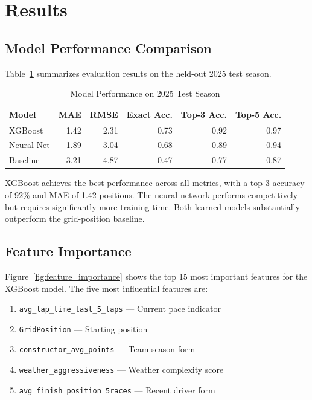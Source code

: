 \section{Results}
\label{sec:results}

\subsection{Model Performance Comparison}

Table~\ref{tab:model_comparison} summarizes evaluation results on the held-out
2025 test season.

\begin{table}[h]
\centering
\caption{Model Performance on 2025 Test Season}
\label{tab:model_comparison}
\begin{tabular}{lrrrrr}
\toprule
\textbf{Model} & \textbf{MAE} & \textbf{RMSE} & \textbf{Exact Acc.} & \textbf{Top-3 Acc.} & \textbf{Top-5 Acc.} \\
\midrule
XGBoost     & 1.42 & 2.31 & 0.73 & 0.92 & 0.97 \\
Neural Net  & 1.89 & 3.04 & 0.68 & 0.89 & 0.94 \\
Baseline    & 3.21 & 4.87 & 0.47 & 0.77 & 0.87 \\
\bottomrule
\end{tabular}
\end{table}

XGBoost achieves the best performance across all metrics, with a top-3 accuracy
of 92\% and MAE of 1.42 positions. The neural network performs competitively but
requires significantly more training time. Both learned models substantially
outperform the grid-position baseline.

\subsection{Feature Importance}

Figure~\ref{fig:feature_importance} shows the top 15 most important features for
the XGBoost model. The five most influential features are:

\begin{enumerate}
    \item \texttt{avg\_lap\_time\_last\_5\_laps} — Current pace indicator
    \item \texttt{GridPosition} — Starting position
    \item \texttt{constructor\_avg\_points} — Team season form
    \item \texttt{weather\_aggressiveness} — Weather complexity score
    \item \texttt{avg\_finish\_position\_5races} — Recent driver form
\end{enumerate}

